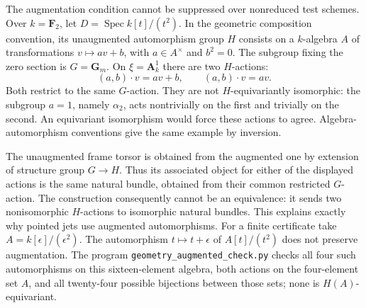 \begin{example}
\label{geo-F-augmentation}
The augmentation condition cannot be suppressed over nonreduced test
schemes. Over $k=\mathbf F_2$, let $D=\operatorname{Spec}k[t]/(t^2)$.
In the geometric composition convention, its unaugmented automorphism
group $H$ consists on a $k$-algebra $A$ of transformations
$v\mapsto av+b$, with $a\in A^\times$ and $b^2=0$.
The subgroup fixing the zero section is $G=\mathbf G_m$.
On $\xi=\mathbf A^1_k$ there are two $H$-actions:
\[
 (a,b)\cdot v=av+b,\qquad (a,b)\cdot v=av.
\]
Both restrict to the same $G$-action. They are not $H$-equivariantly
isomorphic: the subgroup $a=1$, namely $\alpha_2$, acts nontrivially on
the first and trivially on the second. An equivariant isomorphism would
force these actions to agree. Algebra-automorphism conventions give the
same example by inversion.

The unaugmented frame torsor is obtained from the augmented one by
extension of structure group $G\to H$. Thus its associated object for
either of the displayed actions is the same natural bundle, obtained
from their common restricted $G$-action. The construction consequently
cannot be an equivalence: it sends two nonisomorphic $H$-actions to
isomorphic natural bundles. This explains exactly
why pointed jets use augmented automorphisms.
For a finite certificate take $A=k[\epsilon]/(\epsilon^2)$.
The automorphism $t\mapsto t+\epsilon$ of $A[t]/(t^2)$ does not preserve
augmentation. The program \texttt{geometry\_augmented\_check.py}
checks all four such automorphisms on this sixteen-element algebra,
both actions on the four-element set $A$, and all twenty-four possible
bijections between those sets; none is $H(A)$-equivariant.
\end{example}

